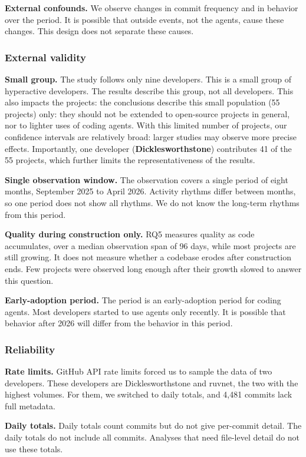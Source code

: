 \documentclass[smallextended]{svjour3}
\begin{document}
\textbf{External confounds.} We observe changes in commit frequency and in behavior over the period. It is possible that outside events, not the agents, cause these changes. This design does not separate these causes.

\subsubsection{External validity}
\textbf{Small group.} The study follows only nine developers. This is a small group of hyperactive developers. The results describe this group, not all developers. This also impacts the projects: the conclusions describe this small population (55 projects) only: they should not be extended to open-source projects in general, nor to lighter uses of coding agents. With this limited number of projects, our confidence intervals are relatively broad: larger studies may observe more precise effects. Importantly, one developer (\textbf{Dicklesworthstone}) contributes 41 of the 55 projects, which further limits the representativeness of the results.


\textbf{Single observation window.} The observation covers a single period of eight months, September 2025 to April 2026. Activity rhythms differ between months, so one period does not show all rhythms. We do not know the long-term rhythms from this period.

\textbf{Quality during construction only.} RQ5 measures quality as code accumulates, over a median observation span of 96 days, while most projects are still growing. It does not measure whether a codebase erodes after construction ends. Few projects were observed long enough after their growth slowed to answer this question.

\textbf{Early-adoption period.} The period is an early-adoption period for coding agents. Most developers started to use agents only recently. It is possible that behavior after 2026 will differ from the behavior in this period.

\subsubsection{Reliability}
\textbf{Rate limits.} GitHub API rate limits forced us to sample the data of two developers. These developers are Dicklesworthstone and ruvnet, the two with the highest volumes. For them, we switched to daily totals, and 4,481 commits lack full metadata.

\textbf{Daily totals.} Daily totals count commits but do not give per-commit detail. The daily totals do not include all commits. Analyses that need file-level detail do not use these totals.
\end{document}
